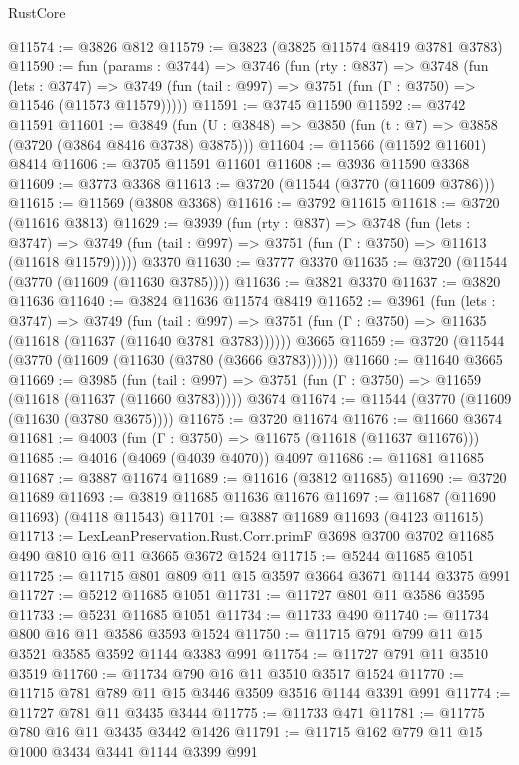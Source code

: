 \begin{lexlean}{RustCore}
\begin{coremodule}
@11574 := @3826 @812
@11579 := @3823 (@3825 @11574 @8419 @3781 @3783)
@11590 := fun (params : @3744) =>
  @3746
    (fun (rty : @837) =>
    @3748
      (fun (lets : @3747) =>
      @3749 (fun (tail : @997) => @3751 (fun (Γ : @3750) => @11546 (@11573 @11579)))))
@11591 := @3745 @11590
@11592 := @3742 @11591
@11601 := @3849 (fun (U : @3848) => @3850 (fun (t : @7) => @3858 (@3720 (@3864 @8416 @3738) @3875)))
@11604 := @11566 (@11592 @11601) @8414
@11606 := @3705 @11591 @11601
@11608 := @3936 @11590 @3368
@11609 := @3773 @3368
@11613 := @3720 (@11544 (@3770 (@11609 @3786)))
@11615 := @11569 (@3808 @3368)
@11616 := @3792 @11615
@11618 := @3720 (@11616 @3813)
@11629 := @3939
    (fun (rty : @837) =>
    @3748
      (fun (lets : @3747) =>
      @3749 (fun (tail : @997) => @3751 (fun (Γ : @3750) => @11613 (@11618 @11579)))))
    @3370
@11630 := @3777 @3370
@11635 := @3720 (@11544 (@3770 (@11609 (@11630 @3785))))
@11636 := @3821 @3370
@11637 := @3820 @11636
@11640 := @3824 @11636 @11574 @8419
@11652 := @3961
    (fun (lets : @3747) =>
    @3749
      (fun (tail : @997) =>
      @3751 (fun (Γ : @3750) => @11635 (@11618 (@11637 (@11640 @3781 @3783))))))
    @3665
@11659 := @3720 (@11544 (@3770 (@11609 (@11630 (@3780 (@3666 @3783))))))
@11660 := @11640 @3665
@11669 := @3985
    (fun (tail : @997) => @3751 (fun (Γ : @3750) => @11659 (@11618 (@11637 (@11660 @3783)))))
    @3674
@11674 := @11544 (@3770 (@11609 (@11630 (@3780 @3675))))
@11675 := @3720 @11674
@11676 := @11660 @3674
@11681 := @4003 (fun (Γ : @3750) => @11675 (@11618 (@11637 @11676)))
@11685 := @4016 (@4069 (@4039 @4070)) @4097
@11686 := @11681 @11685
@11687 := @3887 @11674
@11689 := @11616 (@3812 @11685)
@11690 := @3720 @11689
@11693 := @3819 @11685 @11636 @11676
@11697 := @11687 (@11690 @11693) (@4118 @11543)
@11701 := @3887 @11689 @11693 (@4123 @11615)
@11713 := LexLeanPreservation.Rust.Corr.primF
    @3698
    @3700
    @3702
    @11685
    @490
    @810
    @16
    @11
    @3665
    @3672
    @1524
@11715 := @5244 @11685 @1051
@11725 := @11715 @801 @809 @11 @15 @3597 @3664 @3671 @1144 @3375 @991
@11727 := @5212 @11685 @1051
@11731 := @11727 @801 @11 @3586 @3595
@11733 := @5231 @11685 @1051
@11734 := @11733 @490
@11740 := @11734 @800 @16 @11 @3586 @3593 @1524
@11750 := @11715 @791 @799 @11 @15 @3521 @3585 @3592 @1144 @3383 @991
@11754 := @11727 @791 @11 @3510 @3519
@11760 := @11734 @790 @16 @11 @3510 @3517 @1524
@11770 := @11715 @781 @789 @11 @15 @3446 @3509 @3516 @1144 @3391 @991
@11774 := @11727 @781 @11 @3435 @3444
@11775 := @11733 @471
@11781 := @11775 @780 @16 @11 @3435 @3442 @1426
@11791 := @11715 @162 @779 @11 @15 @1000 @3434 @3441 @1144 @3399 @991

\end{coremodule}
\end{lexlean}
